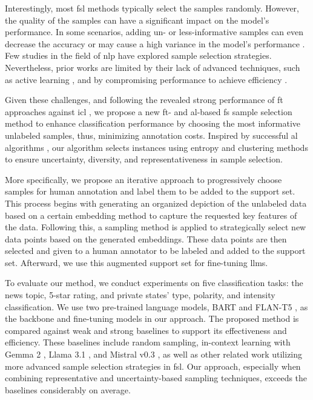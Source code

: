 \documentclass[11pt]{article}
\theoremstyle{definition}
\begin{document}
Interestingly, most \gls*{fsl} methods typically select the samples randomly. However, the quality of the samples can have a significant impact on the model's performance. In some scenarios, adding un- or less-informative samples can even decrease the accuracy or may cause a high variance in the model's performance \cite{zhang2020pegasus, schick-schutze-2021-just}. Few studies in the field of \gls*{nlp} have explored sample selection strategies. Nevertheless, prior works are limited by their lack of advanced techniques, such as active learning \cite{chang2021training}, and by compromising performance to achieve efficiency \cite{muller2022active}.


Given these challenges, and following the revealed strong performance of \gls*{ft} approaches against \gls*{icl} \cite{edwards-camacho-collados-2024-language}, 
we propose a new \gls*{ft}- and \gls*{al}-based \gls*{fs} sample selection method to enhance classification performance by choosing the most informative unlabeled samples, thus, minimizing annotation costs.
Inspired by successful \gls*{al} algorithms \cite{settles2009active}, our algorithm selects instances using entropy and clustering methods to ensure uncertainty, diversity,
and representativeness in sample selection.

More specifically, we propose an iterative approach to progressively choose samples for human annotation and label them to be added to the support set. This process begins with generating an organized depiction of the unlabeled data based on a certain embedding method to capture the requested key features of the data. Following this, a sampling method is applied to strategically select new data points based on the generated embeddings. These data points are then selected and given to a human annotator to be labeled and added to the support set. Afterward, we use this augmented support set for fine-tuning \gls*{llm}s.

To evaluate our method, we conduct experiments on five classification tasks: the news topic, 5-star rating, and private states' type, polarity, and intensity classification. 
We use two pre-trained language models, BART and FLAN-T5 \cite{lewis2019bart, chung2022scaling}, 
as the backbone and fine-tuning models in our approach. The proposed method is compared against weak and strong baselines to support its effectiveness and efficiency. These baselines include random sampling, in-context learning with Gemma 2 \cite{team2024gemma}, Llama 3.1 \cite{dubey2024llama}, and Mistral v0.3 \cite{jiang2023mistral}, as well as other related work utilizing more advanced sample selection strategies in \gls*{fsl}. Our approach, especially when combining representative and uncertainty-based sampling techniques, exceeds the baselines considerably on average.
\end{document}
